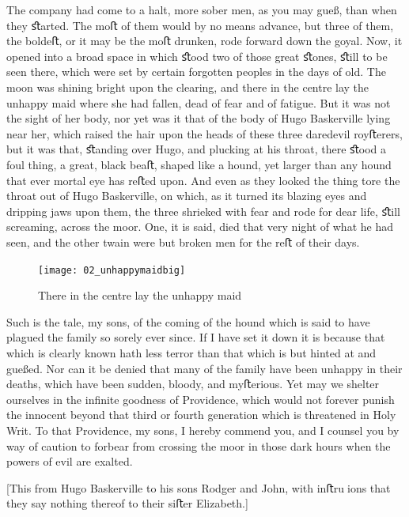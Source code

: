 \documentclass[paper=5.5in:8.5in,BCOR=7mm,twoside,DIV=calc,12pt,usegeometry,openany,chapterprefix,endperiod]{scrbook} %
\begin{document}
The company had come to a halt, more sober men, as you may gueß, than when they ﬆarted. The moﬅ of them would by no means advance, but three of them, the boldeﬅ, or it may be the moﬅ drunken, rode forward down the goyal. Now, it opened into a broad space in which ﬆood two of those great ﬆones, ﬆill to be seen there, which were set by certain forgotten peoples in the days of old. The moon was shining bright upon the clearing, and there in the centre lay the unhappy maid where she had fallen, dead of fear and of fatigue. But it was not the sight of her body, nor yet was it that of the body of Hugo Baskerville lying near her, which raised the hair upon the heads of these three daredevil royﬅerers, but it was that, ﬆanding over Hugo, and plucking at his throat, there ﬆood a foul thing, a great, black beaﬅ, shaped like a hound, yet larger than any hound that ever mortal eye has reﬅed upon. And even as they looked the thing tore the throat out of Hugo Baskerville, on which, as it turned its blazing eyes and dripping jaws upon them, the three shrieked with fear and rode for dear life, ﬆill screaming, across the moor. One, it is said, died that very night of what he had seen, and the other twain were but broken men for the reﬅ of their days.

\begin{figure}[tbph]
\centering
\texttt{[image: 02\_unhappymaidbig]}
\caption{There in the centre lay the unhappy maid}
\end{figure}

Such is the tale, my sons, of the coming of the hound which is said to have plagued the family so sorely ever since. If I have set it down it is because that which is clearly known hath less terror than that which is but hinted at and gueßed. Nor can it be denied that many of the family have been unhappy in their deaths, which have been sudden, bloody, and myﬅerious. Yet may we shelter ourselves in the inﬁnite goodness of Providence, which would not forever punish the innocent beyond that third or fourth generation which is threatened in Holy Writ. To that Providence, my sons, I hereby commend you, and I counsel you by way of caution to forbear from crossing the moor in those dark hours when the powers of evil are exalted.

[This from Hugo Baskerville to his sons Rodger and John, with inﬅruions that they say nothing thereof to their siﬅer Elizabeth.]

\vfill

\normalfont
\end{document}
